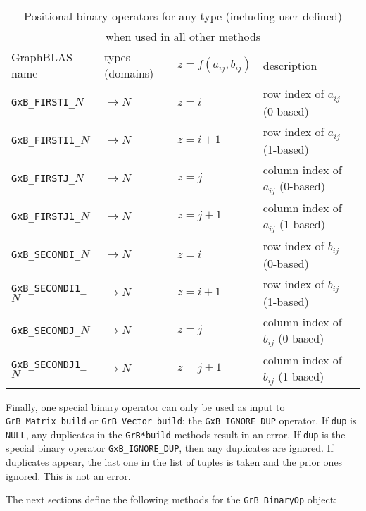 \documentclass[12pt]{article}
\begin{document}
\vspace{0.2in}
{\footnotesize
\begin{tabular}{|llll|}
\hline
\multicolumn{4}{|c|}{Positional binary operators for any type (including user-defined)} \\
\multicolumn{4}{|c|}{when used in all other methods} \\
\hline
GraphBLAS name            & types (domains)   & $z=f(a_{ij},b_{ij})$      & description \\
\hline
\verb'GxB_FIRSTI_'$N$    & $ \rightarrow N$  & $z = i$       & row index of $a_{ij}$ (0-based) \\
\verb'GxB_FIRSTI1_'$N$   & $ \rightarrow N$  & $z = i+1$     & row index of $a_{ij}$ (1-based) \\
\verb'GxB_FIRSTJ_'$N$    & $ \rightarrow N$  & $z = j$       & column index of $a_{ij}$ (0-based) \\
\verb'GxB_FIRSTJ1_'$N$   & $ \rightarrow N$  & $z = j+1$     & column index of $a_{ij}$ (1-based) \\
\verb'GxB_SECONDI_'$N$   & $ \rightarrow N$  & $z = i$       & row index of $b_{ij}$ (0-based) \\
\verb'GxB_SECONDI1_'$N$  & $ \rightarrow N$  & $z = i+1$     & row index of $b_{ij}$ (1-based) \\
\verb'GxB_SECONDJ_'$N$   & $ \rightarrow N$  & $z = j$       & column index of $b_{ij}$ (0-based) \\
\verb'GxB_SECONDJ1_'$N$  & $ \rightarrow N$  & $z = j+1$     & column index of $b_{ij}$ (1-based) \\
\hline
\end{tabular}
}
\vspace{0.2in}

Finally, one special binary operator can only be used as input to
\verb'GrB_Matrix_build' or \verb'GrB_Vector_build': the \verb'GxB_IGNORE_DUP'
operator.  If \verb'dup' is \verb'NULL', any duplicates in the \verb'GrB*build'
methods result in an error.  If \verb'dup' is the special binary operator
\verb'GxB_IGNORE_DUP', then any duplicates are ignored.  If duplicates appear,
the last one in the list of tuples is taken and the prior ones ignored.  This
is not an error.

The next sections define the following methods for the \verb'GrB_BinaryOp'
object:
\end{document}
